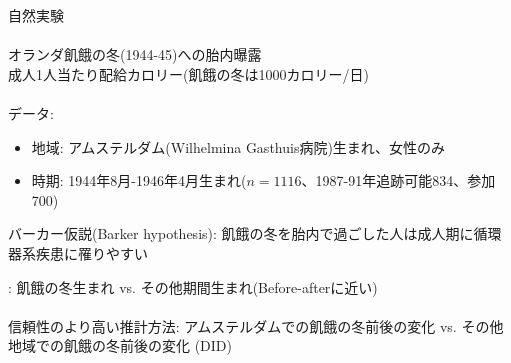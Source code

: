 \begin{frame}{}
自然実験\\~\\
オランダ飢餓の冬(1944-45)への胎内曝露 \citep{Lumey1997}\\
成人1人当たり配給カロリー(飢餓の冬は1000カロリー/日)\\~\\
データ:
\begin{itemize}
\vspace{1.0ex}\setlength{\itemsep}{1.0ex}\setlength{\baselineskip}{12pt}
\item	地域: アムステルダム(Wilhelmina Gasthuis病院)生まれ、女性のみ
\item	時期: 1944年8月-1946年4月生まれ($n=1116$、1987-91年追跡可能834、参加700)
\end{itemize}
\begin{dinglist}{43}
\vspace{1.0ex}\setlength{\itemsep}{1.0ex}\setlength{\baselineskip}{12pt}
\item	バーカー仮説(Barker hypothesis): 飢餓の冬を胎内で過ごした人は成人期に循環器系疾患に罹りやすい
\end{dinglist}
\vspace{2ex}
\pause
\citet{Lumey1997}: 飢餓の冬生まれ vs. その他期間生まれ(Before-afterに近い)\\~\\
\pause
信頼性のより高い推計方法: アムステルダムでの飢餓の冬前後の変化 vs. その他地域での飢餓の冬前後の変化 (DID)
\end{frame}


